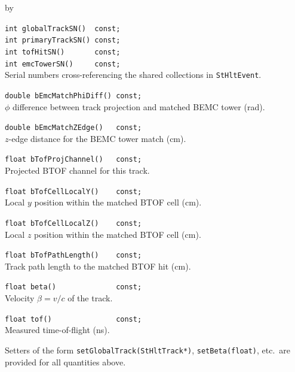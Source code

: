 \documentclass[twoside]{article}
\newcommand{\entrylabel}[1]{\mbox{\textbf{{#1}}}\hfil}%
\newenvironment{entry}
{\begin{list}{}%
    {\renewcommand{\makelabel}{\entrylabel}%
     \setlength{\labelwidth}{90pt}%
     \setlength{\leftmargin}{\labelwidth}
     \advance\leftmargin by \labelsep%
      }%
    }%
  {\end{list}}
\newcommand{\Entrylabel}[1]%
{\raisebox{0pt}[1ex][0pt]{\makebox[\labelwidth][l]%
    {\parbox[t]{\labelwidth}{\hspace{0pt}\textbf{{#1}}}}}}
\newenvironment{Entry}%
{\renewcommand{\entrylabel}{\Entrylabel}\begin{entry}}%
  {\end{entry}}
\begin{document}
\begin{Entry}
    \verb+int globalTrackSN()  const;+\\
    \verb+int primaryTrackSN() const;+\\
    \verb+int tofHitSN()       const;+\\
    \verb+int emcTowerSN()     const;+\\
    Serial numbers cross-referencing the shared collections in
    \texttt{StHltEvent}.

    \verb+double bEmcMatchPhiDiff() const;+\\
    $\phi$ difference between track projection and matched BEMC tower (rad).

    \verb+double bEmcMatchZEdge()   const;+\\
    $z$-edge distance for the BEMC tower match (cm).

    \verb+float bTofProjChannel()   const;+\\
    Projected BTOF channel for this track.

    \verb+float bTofCellLocalY()    const;+\\
    Local $y$ position within the matched BTOF cell (cm).

    \verb+float bTofCellLocalZ()    const;+\\
    Local $z$ position within the matched BTOF cell (cm).

    \verb+float bTofPathLength()    const;+\\
    Track path length to the matched BTOF hit (cm).

    \verb+float beta()              const;+\\
    Velocity $\beta = v/c$ of the track.

    \verb+float tof()               const;+\\
    Measured time-of-flight (ns).

    Setters of the form \verb+setGlobalTrack(StHltTrack*)+,
    \verb+setBeta(float)+, etc.\ are provided for all quantities above.
\end{Entry}
\clearpage

\end{document}

